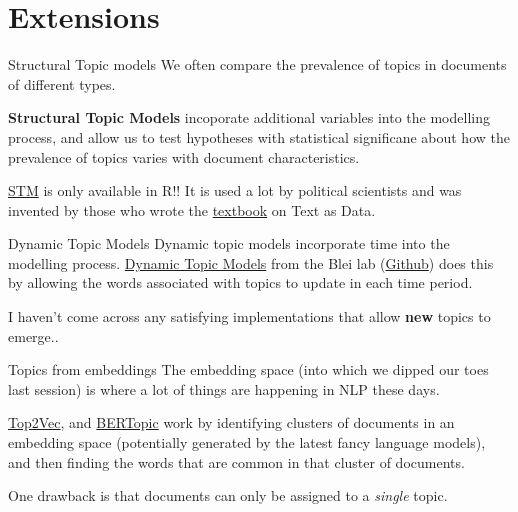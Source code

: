 \documentclass[
  10pt,
  ignorenonframetext,
  aspectratio=169]{beamer}
\begin{document}
\hypertarget{extensions}{%
\section{Extensions}\label{extensions}}

\begin{frame}{Structural Topic models}
\protect\hypertarget{structural-topic-models}{}
We often compare the prevalence of topics in documents of different
types.

\textbf{Structural Topic Models} incoporate additional variables into
the modelling process, and allow us to test hypotheses with statistical
significane about how the prevalence of topics varies with document
characteristics.

\href{https://www.structuraltopicmodel.com/}{STM} is only available in
R!! It is used a lot by political scientists and was invented by those
who wrote the
\href{https://press.princeton.edu/books/hardcover/9780691207544/text-as-data}{textbook}
on Text as Data.
\end{frame}

\begin{frame}{Dynamic Topic Models}
\protect\hypertarget{dynamic-topic-models}{}
Dynamic topic models incorporate time into the modelling process.
\href{https://mimno.infosci.cornell.edu/info6150/readings/dynamic_topic_models.pdf}{Dynamic
Topic Models} from the Blei lab
(\href{https://github.com/blei-lab/dtm}{Github}) does this by allowing
the words associated with topics to update in each time period.

I haven't come across any satisfying implementations that allow
\textbf{new} topics to emerge..
\end{frame}

\begin{frame}{Topics from embeddings}
\protect\hypertarget{topics-from-embeddings}{}
The embedding space (into which we dipped our toes last session) is
where a lot of things are happening in NLP these days.

\href{https://github.com/ddangelov/Top2Vec}{Top2Vec}, and
\href{https://maartengr.github.io/BERTopic/index.html}{BERTopic} work by
identifying clusters of documents in an embedding space (potentially
generated by the latest fancy language models), and then finding the
words that are common in that cluster of documents.

One drawback is that documents can only be assigned to a \emph{single}
topic.
\end{frame}
\end{document}
